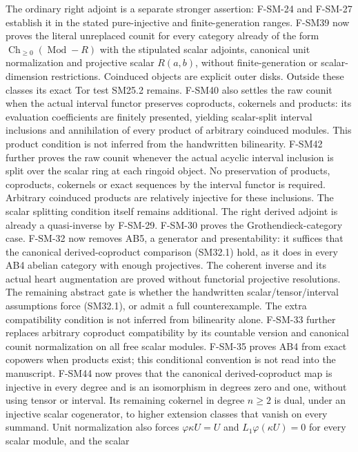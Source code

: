 \begin{description}[style=nextline,leftmargin=0pt]
The ordinary right adjoint is a separate stronger assertion:
F-SM-24 and F-SM-27 establish it in the stated pure-injective and
finite-generation ranges. F-SM39 now proves the literal unreplaced
counit for every category already of the form $\operatorname{Ch}_{\ge0}(\operatorname{Mod}\!-\!R)$
with the stipulated scalar adjoints, canonical unit normalization and
projective scalar $R(a,b)$, without finite-generation or scalar-dimension
restrictions. Coinduced objects are explicit outer disks. Outside these
classes its exact Tor test SM25.2 remains. F-SM40 also settles the raw
counit when the actual interval functor preserves coproducts,
cokernels and products: its evaluation coefficients are finitely
presented, yielding scalar-split interval inclusions and annihilation
of every product of arbitrary coinduced modules. This product
condition is not inferred from the handwritten bilinearity. F-SM42
further proves the raw counit whenever the actual acyclic interval
inclusion is split over the scalar ring at each ringoid object. No
preservation of products, coproducts, cokernels or exact sequences
by the interval functor is required. Arbitrary coinduced products
are relatively injective for these inclusions. The scalar splitting
condition itself remains additional. The right derived adjoint is already a quasi-inverse by
F-SM-29. F-SM-30 proves the Grothendieck-category case.
F-SM-32 now removes AB5, a generator and presentability: it suffices
that the canonical derived-coproduct comparison (SM32.1) hold, as it
does in every AB4 abelian category with enough projectives. The
coherent inverse and its actual heart augmentation are proved without
functorial projective resolutions. The remaining abstract gate is
whether the handwritten scalar/tensor/interval assumptions force
(SM32.1), or admit a full counterexample. The extra compatibility
condition is not inferred from bilinearity alone. F-SM-33 further replaces arbitrary coproduct compatibility by its
countable version and canonical counit normalization on all free scalar
modules. F-SM-35 proves AB4 from exact copowers when products exist;
this conditional convention is not read into the manuscript.
F-SM44 now proves that the canonical derived-coproduct map is
injective in every degree and is an isomorphism in degrees zero and
one, without using tensor or interval. Its remaining cokernel in
degree $n\ge2$ is dual, under an injective scalar cogenerator, to
higher extension classes that vanish on every summand. Unit
normalization also forces $\varphi\kappa U=U$ and
$L_1\varphi(\kappa U)=0$ for every scalar module, and the scalar

\end{description}
